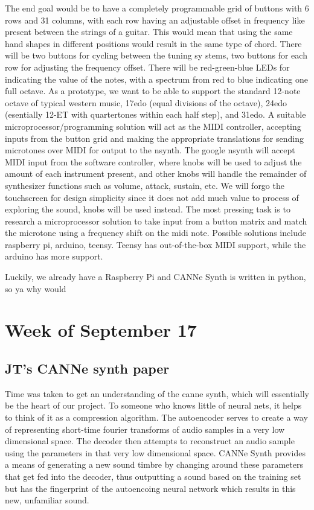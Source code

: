 \documentclass{article}
\begin{document}
The end goal would be to have a completely programmable grid of buttons with 6 rows and 31 columns, with each row having an adjustable offset in frequency like present between the strings of a guitar. This would mean that using the same hand shapes in different positions would result in the same type of chord. There will be two buttons for cycling between the tuning sy
stems, two buttons for each row for adjusting the frequency offset. There will be red-green-blue LEDs for indicating the value of the notes, with a spectrum from red to blue indicating one full octave. As a prototype, we want to be able to support the standard 12-note octave of typical western music, 17edo (equal divisions of the octave), 24edo (esentially 12-ET with quartertones within each half step), and 31edo. A suitable microprocessor/programming solution will act as the MIDI controller, accepting inputs from the button grid and making the appropriate translations for sending microtones over MIDI for output to the nsynth. The google nsynth will accept MIDI input from the software controller, where knobs will be used to adjust the amount of each instrument present, and  other knobs will handle the remainder of synthesizer functions such as volume, attack, sustain, etc. We will forgo the touchscreen for design simplicity since it does not add much value to process of exploring the sound, knobs will be used instead. The most pressing task is to research a microprocessor solution to take input from a button matrix and match the microtone using a frequency shift on the midi note. Possible solutions include raspberry pi, arduino, teensy. Teensy has out-of-the-box MIDI support, while the arduino has more support.

Luckily, we already have a Raspberry Pi and CANNe Synth is written in python, so ya why would


\section{Week of September 17}

\subsection{JT's CANNe synth paper}

Time was taken to get an understanding of the canne synth, which will essentially be the heart of our project. To someone who knows little of neural nets, it helps to think of it as a compression algorithm. The autoencoder serves to create a way of representing short-time fourier transforms of audio samples in a very low dimensional space. The decoder then attempts to reconstruct an audio sample using the parameters in that very low dimensional space. CANNe Synth provides a means of generating a new sound timbre by changing around these parameters that get fed into the decoder, thus outputting a sound based on the training set but has the fingerprint of the autoencoing neural network which results in this new, unfamiliar sound.
\end{document}
